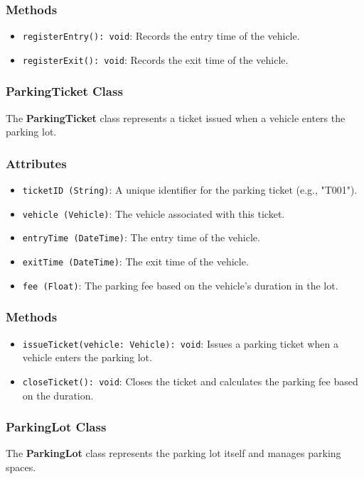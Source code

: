 \subsubsection*{Methods}
\begin{itemize}
    \item \texttt{registerEntry(): void}: Records the entry time of the vehicle.
    \item \texttt{registerExit(): void}: Records the exit time of the vehicle.
\end{itemize}

\subsubsection{ParkingTicket Class}
The \textbf{ParkingTicket} class represents a ticket issued when a vehicle enters the parking lot.

\subsubsection*{Attributes}
\begin{itemize}
    \item \texttt{ticketID (String)}: A unique identifier for the parking ticket (e.g., "T001").
    \item \texttt{vehicle (Vehicle)}: The vehicle associated with this ticket.
    \item \texttt{entryTime (DateTime)}: The entry time of the vehicle.
    \item \texttt{exitTime (DateTime)}: The exit time of the vehicle.
    \item \texttt{fee (Float)}: The parking fee based on the vehicle's duration in the lot.
\end{itemize}

\subsubsection*{Methods}
\begin{itemize}
    \item \texttt{issueTicket(vehicle: Vehicle): void}: Issues a parking ticket when a vehicle enters the parking lot.
    \item \texttt{closeTicket(): void}: Closes the ticket and calculates the parking fee based on the duration.
\end{itemize}

\subsubsection{ParkingLot Class}
The \textbf{ParkingLot} class represents the parking lot itself and manages parking spaces.

